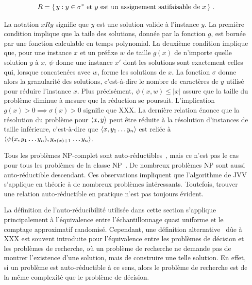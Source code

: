 \begin{equation}
    R = \set{ y : y \in \sigma^{*} \text{ et } y \text{ est un assignement satifaisable de } x } \,.
\end{equation}

La notation $xRy$ signifie que $y$ est une solution valide à l'instance $y$. La première condition implique que la taile des solutions, donnée par la fonction $g$, est bornée par une fonction calculable en temps polynomial. La deuxième condition implique que, pour une instance $x$ et un préfixe $w$ de taille $g(x)$ de n'importe quelle solution $y$ à $x$, $\psi$ donne une instance $x'$ dont les solutions sont exactement celles qui, lorsque concatenées avec $w$, forme les solutions de $x$. La fonction $\sigma$ donne alors la granularité des solutions, c'est-à-dire le nombre de caractères de $y$ utilisé pour réduire l'instance $x$. Plus précisément, $\psi(x, w) \leq \lvert x \rvert$ assure que la taille du problème diminue à mesure que la réduction se poursuit. L'implication $g(x) > 0 \implies  \sigma(x) > 0$ signifie que XXX. La dernière relation énonce que la résolution du problème pour $\braket{x, y}$ peut être réduite à la résolution d'instances de taille inférieure, c'est-à-dire que $\braket{x, y_{1}\dots y_{n}}$ est reliée à $\braket{\psi(x, y_{1}\dots y_{n}), y_{\sigma(x)+1}\dots y_{n}}$.


Tous les problèmes \textsf{NP}-complet sont auto-réductibles~\cite{goldreichComputationalComplexityConceptual2008a}, mais ce n'est pas le cas pour tous les problèmes de la classe \textsf{NP}~\cite{khullerPlanarGraphColoring1991a}. De nombreux problèmes \textsf{NP} sont aussi auto-réductible descendant. Ces observations impliquent que l'algorithme de JVV s'applique en théorie à de nombreux problèmes intéressants. Toutefois, trouver une relation auto-réductible en pratique n'est pas toujours évident.

La définition de l'auto-réducibilité utilisée dans cette section s'applique principalement à l'équivalence entre l'échantillonnage quasi uniforme et le comptage approximatif randomisé. Cependant, une définition alternative~\cite{goldreichComputationalComplexityConceptual2008a} dûe à XXX est souvent introduite pour l'équivalence entre les problèmes de décision et les problèmes de recherche, où un problème de recherche ne demande pas de montrer l'existence d'une solution, mais de construire une telle solution. En effet, si un problème est auto-réductible à ce sens, alors le problème de recherche est de la même complexité que le problème de décision. 


